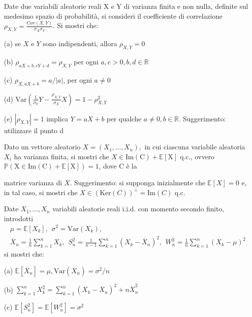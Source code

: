 
\ParteEsercizi

\Esercizio{}

Date due variabili aleatorie reali X e Y di varianza finita e non nulla, definite sul medesimo spazio di probabilità, si consideri il coefficiente di correlazione $\rho _{X,Y} =\frac{\mathrm{Cov} (X,Y)}{\sigma _{X} \sigma _{Y}}$. Si mostri che:

(a) se $X$ e $Y$ sono indipendenti, allora $\rho _{X,Y} =0$

(b) $\rho _{aX+b,cY+d} =\rho _{X,Y}$ per ogni $a,c >0,b,d\in \mathbb{R}$

(c) $\rho _{X,aX+b} =a/|a|$, per ogni $a\neq 0$

(d) $\mathrm{Var}\left(\frac{1}{\sigma _{Y}} Y-\frac{\rho _{X,Y}}{\sigma _{X}} X\right) =1-\rho _{X,Y}^{2}$

(e) $| \rho _{X,Y}| =1$ implica $Y=aX+b$ per qualche $a\neq 0,b\in \mathbb{R}$. Suggerimento: utilizzare il punto d
\Esercizio{* }

Dato un vettore aleatorio $X=( X_{1} ,\dotsc ,X_{n}) ,$ in cui ciascuna variabile aleatoria $X_{i}$ ha varianza finita, si mostri che $X\in \mathrm{Im} (\mathrm{C} )+\mathbb{E} [\mathrm{X} ]$ q.c., ovvero $\mathbb{P} (\mathrm{X} \in \mathrm{Im} (\mathrm{C} )+\mathbb{E} [\mathrm{X} ])=1$, dove $\mathrm{C}$ è la

matrice varianza di $X$. Suggerimento: si supponga inizialmente che $\mathbb{E} [X]=0$ e, in tal caso, si mostri che $X\in (\mathrm{Ker} (C))^{\perp } =\mathrm{Im} (C)$ q.c.
\Esercizio{}

Date $X_{1} ,\dotsc ,X_{n}$ variabili aleatorie reali i.i.d. con momento secondo finito, introdotti
\begin{gather*}
\mu =\mathbb{E}[ X_{k}] ,\ \ \sigma ^{2} =\mathrm{Var}( X_{k}) ,\\
\overline{X}_{n} =\frac{1}{n}\sum _{k=1}^{n} X_{k} ,\ \ S_{n}^{2} =\frac{1}{n-1}\sum _{k=1}^{n}( X_{k} -\overline{X}_{n})^{2} ,\ \ W_{n}^{2} =\frac{1}{n}\sum _{k=1}^{n}( X_{k} -\mu )^{2}
\end{gather*}
si mostri che:

(a) $\mathbb{E}[\overline{X}_{n}] =\mu ,\mathrm{Var}(\overline{X}_{n}) =\sigma ^{2} /n$

(b) $\sum _{k=1}^{n} X_{k}^{2} =\sum _{k=1}^{n}( X_{k} -\overline{X}_{n})^{2} +n\overline{X}_{n}^{2}$

(c) $\mathbb{E}\left[ S_{n}^{2}\right] =\mathbb{E}\left[ W_{n}^{2}\right] =\sigma ^{2}$
\Esercizio{}

